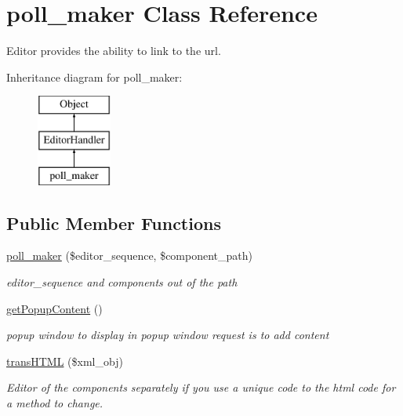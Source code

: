 \hypertarget{classpoll__maker}{}\section{poll\+\_\+maker Class Reference}
\label{classpoll__maker}


Editor provides the ability to link to the url.  


Inheritance diagram for poll\+\_\+maker\+:\begin{figure}[H]
\begin{center}
\leavevmode
\includegraphics[height=3.000000cm]{classpoll__maker}
\end{center}
\end{figure}
\subsection*{Public Member Functions}
\begin{DoxyCompactItemize}
\item 
\hyperlink{classpoll__maker_ae8956a214b15ddd49a3e7538a15791ba}{poll\+\_\+maker} (\$editor\+\_\+sequence, \$component\+\_\+path)
\begin{DoxyCompactList}\small\item\em editor\+\_\+sequence and components out of the path \end{DoxyCompactList}\item 
\hyperlink{classpoll__maker_aa332538c710974acc59a6209bb1f5503}{get\+Popup\+Content} ()
\begin{DoxyCompactList}\small\item\em popup window to display in popup window request is to add content \end{DoxyCompactList}\item 
\hyperlink{classpoll__maker_ac8d4b0f45f16016ad7f711123cc98ea8}{trans\+H\+T\+ML} (\$xml\+\_\+obj)
\begin{DoxyCompactList}\small\item\em Editor of the components separately if you use a unique code to the html code for a method to change. \end{DoxyCompactList}\end{DoxyCompactItemize}
